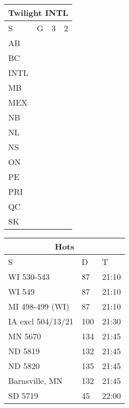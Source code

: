 \documentclass{article}
\begin{document}
\begin{tabular}[t]{@{}ll|l|l@{}}
\multicolumn{4}{c}{\textbf{Twilight INTL}}                               \\ 
\toprule
S    & G                  & 3                & 2                \\ \midrule
AB   & \cellcolor{blue}   & \cellcolor{blue} & \cellcolor{blue} \\
BC   & \cellcolor{yellow} &                  & \cellcolor{blue} \\
INTL & \cellcolor{blue}   & \cellcolor{blue} & \cellcolor{blue} \\
MB   & \cellcolor{blue}   & \cellcolor{blue} & \cellcolor{blue} \\
MEX  & \cellcolor{blue}   & \cellcolor{blue} & \cellcolor{blue} \\
NB   & \cellcolor{red}    &                  & \cellcolor{blue} \\
NL   & \cellcolor{red}    &                  & \cellcolor{blue} \\
NS   & \cellcolor{red}    &                  & \cellcolor{blue} \\
ON   & \cellcolor{purple} &                  & \cellcolor{blue} \\
PE   & \cellcolor{red}    &                  & \cellcolor{blue} \\
PRI  & \cellcolor{orange} & \cellcolor{blue} & \cellcolor{blue} \\
QC   & \cellcolor{red}    &                  & \cellcolor{blue} \\
SK   & \cellcolor{blue}   & \cellcolor{blue} & \cellcolor{blue} \\ \bottomrule
\end{tabular}
\hspace{1em}
\Large
\begin{tabular}[t]{@{}lll@{}}
\multicolumn{3}{c}{\textbf{Hots}}                                          \\ 
\toprule
S                 & D   & T     \\ \midrule
WI 530-543        & 87  & 21:10 \\
WI 549            & 87  & 21:10 \\
MI 498-499 (WI)   & 87  & 21:10 \\
IA excl 504/13/21 & 100 & 21:30 \\
MN 5670           & 134 & 21:45 \\
ND 5819           & 132 & 21:45 \\
ND 5820           & 135 & 21:45 \\
Barnsville, MN    & 132 & 21:45 \\
SD 5719           & 45  & 22:00 \\ \bottomrule
\end{tabular}
\end{document}
